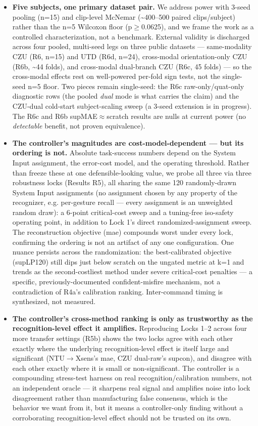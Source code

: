 \begin{itemize}
  \item \textbf{Five subjects, one primary dataset pair.} We address power with 3-seed pooling (n=15) and clip-level McNemar (\textasciitilde{}400--500 paired clips/subject) rather than the n=5 Wilcoxon floor (p$\ge$0.0625), and we frame the work as a controlled characterization, not a benchmark. External validity is discharged across four pooled, multi-seed legs on three public datasets --- same-modality CZU (R6, n=15) and UTD (R6d, n=24), cross-modal orientation-only CZU (R6b, \textasciitilde{}44 folds), and cross-modal dual-branch CZU (R6c, 45 folds) --- so the cross-modal effects rest on well-powered per-fold sign tests, not the single-seed n=5 floor. Two pieces remain single-seed: the R6c raw-only/quat-only diagnostic rows (the pooled \textit{dual} mode is what carries the claim) and the CZU-dual cold-start subject-scaling sweep (a 3-seed extension is in progress). The R6c and R6b supMAE$\approx$scratch results are nulls at current power (no \textit{detectable} benefit, not proven equivalence).
  \item \textbf{The controller's magnitudes are cost-model-dependent --- but its ordering is not.} Absolute task-success numbers depend on the System Input assignment, the error-cost model, and the operating threshold. Rather than freeze these at one defensible-looking value, we probe all three via three robustness locks (Results R5), all sharing the same 120 randomly-drawn System Input assignments (no assignment chosen by any property of the recognizer, e.g. per-gesture recall --- every assignment is an unweighted random draw): a 6-point critical-cost sweep and a tuning-free iso-safety operating point, in addition to Lock 1's direct randomized-assignment sweep. The reconstruction objective (mae) compounds worst under every lock, confirming the ordering is not an artifact of any one configuration. One nuance persists across the randomization: the best-calibrated objective (supLP120) still dips just below scratch on the ungated metric at k=1 and trends as the second-costliest method under severe critical-cost penalties --- a specific, previously-documented confident-misfire mechanism, not a contradiction of R4a's calibration ranking. Inter-command timing is synthesized, not measured.
  \item \textbf{The controller's cross-method ranking is only as trustworthy as the recognition-level effect it amplifies.} Reproducing Locks 1--2 across four more transfer settings (R5b) shows the two locks agree with each other exactly where the underlying recognition-level effect is itself large and significant (NTU$\rightarrow$Xsens's mae, CZU dual-raw's supcon), and disagree with each other exactly where it is small or non-significant. The controller is a compounding stress-test harness on real recognition/calibration numbers, not an independent oracle --- it sharpens real signal and amplifies noise into lock disagreement rather than manufacturing false consensus, which is the behavior we want from it, but it means a controller-only finding without a corroborating recognition-level effect should not be trusted on its own.

\end{itemize}

